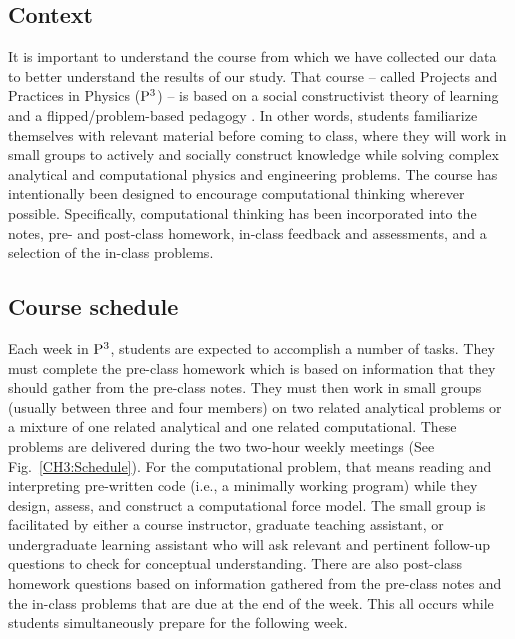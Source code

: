 \documentclass{msuphddissertation}
\begin{document}
\begin{doublespace}


\chapter{Context}\label{CH3:Context}

It is important to understand the course from which we have collected our data to better understand the results of our study.  That course -- called Projects and Practices in Physics (${\rm P}^{3}$) -- is based on a social constructivist theory of learning and a flipped/problem-based pedagogy \cite{Irving2017}.  In other words, students familiarize themselves with relevant material before coming to class, where they will work in small groups to actively and socially construct knowledge while solving complex analytical and computational physics and engineering problems.  The course has intentionally been designed to encourage computational thinking wherever possible.  Specifically, computational thinking has been incorporated into the notes, pre- and post-class homework, in-class feedback and assessments, and a selection of the in-class problems.

\section{Course schedule}

Each week in ${\rm P}^{3}$, students are expected to accomplish a number of tasks. They must complete the pre-class homework which is based on information that they should gather from the pre-class notes.  They must then work in small groups (usually between three and four members) on two related analytical problems or a mixture of one related analytical and one related computational.  These problems are delivered during the two two-hour weekly meetings (See Fig.~\ref{CH3:Schedule}).  For the computational problem, that means reading and interpreting pre-written code (i.e., a minimally working program) while they design, assess, and construct a computational force model.  The small group is facilitated by either a course instructor, graduate teaching assistant, or undergraduate learning assistant who will ask relevant and pertinent follow-up questions to check for conceptual understanding.  There are also post-class homework questions based on information gathered from the pre-class notes and the in-class problems that are due at the end of the week.  This all occurs while students simultaneously prepare for the following week.


\end{doublespace}
\end{document}
